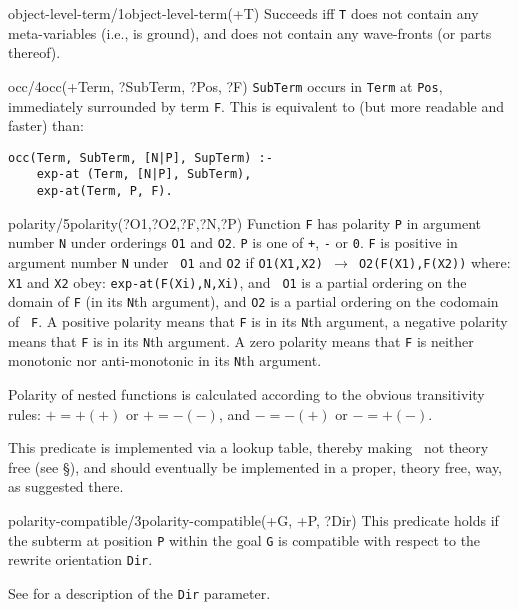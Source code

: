 \begin{predicate}{object-level-term/1}{object-level-term(+T)}%
Succeeds iff {\tt T} does not contain any meta-variables (i.e., is
ground), and does not contain any wave-fronts (or parts thereof).
\end{predicate}


\begin{predicate}{occ/4}{occ(+Term, ?SubTerm, ?Pos, ?F)}%
{\tt SubTerm} occurs in {\tt Term} at {\tt Pos}, immediately
surrounded by term {\tt F}.  This is equivalent to (but more readable
and faster) than:
\begin{verbatim}
occ(Term, SubTerm, [N|P], SupTerm) :-
    exp-at (Term, [N|P], SubTerm),
    exp-at(Term, P, F).
\end{verbatim}
\end{predicate}

\begin{predicate}{polarity/5}{polarity(?O1,?O2,?F,?N,?P)}%
Function {\tt F} has polarity {\tt P} in argument number {\tt N} under
orderings {\tt O1} and {\tt O2}. {\tt P} is one of {\tt +}, {\tt -} or
{\tt 0}.  {\tt F} is positive in argument number {\tt N} under {\tt
O1} and {\tt O2} if {\tt O1(X1,X2) $\rightarrow$ O2(F(X1),F(X2))}
where: {\tt X1} and {\tt X2} obey: {\tt exp-at(F(Xi),N,Xi)}, and {\tt
O1} is a partial ordering on the domain of {\tt F} (in its {\tt N}th
argument), and {\tt O2} is a partial ordering on the codomain of {\tt
F}. A positive polarity means that {\tt F} is  in its
{\tt N}th argument, a negative polarity means that {\tt F} is
 in its {\tt N}th argument. A zero polarity means
that {\tt F} is neither monotonic nor anti-monotonic in its {\tt N}th
argument.

Polarity of nested functions is calculated according to the obvious
transitivity rules: $+ = +(+)$ or $+ = -(-)$, and $- = -(+)$ or $- =
+(-)$.

This predicate is implemented via a lookup table, thereby making
\notnice \clam\ not theory free (see \S{}), and
should eventually be implemented in a proper, theory free, way, as
suggested there.
\end{predicate}

\begin{predicate}{polarity-compatible/3}{polarity-compatible(+G, +P, ?Dir)}%
This predicate holds if the subterm at position {\tt P} within the
goal {\tt G} is compatible with respect to the rewrite orientation
{\tt Dir}.

See  for a description of the {\tt Dir} parameter. 
\end{predicate}

